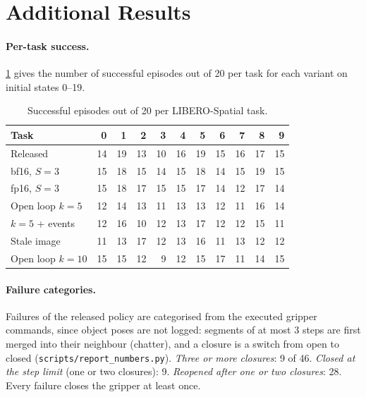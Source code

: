 \section{Additional Results}
\label{app:results}

\paragraph{Per-task success.}
\cref{tab:pertask} gives the number of successful episodes out of 20 per task for each variant on initial states 0--19.

\begin{table}[h]
\centering\small
\setlength{\tabcolsep}{3.2pt}
\begin{tabular}{@{}lrrrrrrrrrr@{}}
\toprule
Task & 0 & 1 & 2 & 3 & 4 & 5 & 6 & 7 & 8 & 9 \\
\midrule
Released & 14 & 19 & 13 & 10 & 16 & 19 & 15 & 16 & 17 & 15 \\
bf16, $S{=}3$ & 15 & 18 & 15 & 14 & 15 & 18 & 14 & 15 & 19 & 15 \\
fp16, $S{=}3$ & 15 & 18 & 17 & 15 & 15 & 17 & 14 & 12 & 17 & 14 \\
Open loop $k{=}5$ & 12 & 14 & 13 & 11 & 13 & 13 & 12 & 11 & 16 & 14 \\
$k{=}5$ + events & 12 & 16 & 10 & 12 & 13 & 17 & 12 & 12 & 15 & 11 \\
Stale image & 11 & 13 & 17 & 12 & 13 & 16 & 11 & 13 & 12 & 12 \\
Open loop $k{=}10$ & 15 & 15 & 12 & 9 & 12 & 15 & 17 & 11 & 14 & 15 \\
\bottomrule
\end{tabular}
\caption{Successful episodes out of 20 per LIBERO-Spatial task.}
\label{tab:pertask}
\end{table}

\paragraph{Failure categories.}
Failures of the released policy are categorised from the executed gripper commands, since object poses are not logged: segments of at most 3 steps are first merged into their neighbour (chatter), and a closure is a switch from open to closed (\texttt{scripts/report\_numbers.py}).
\emph{Three or more closures}: 9 of 46.
\emph{Closed at the step limit} (one or two closures): 9.
\emph{Reopened after one or two closures}: 28.
Every failure closes the gripper at least once.

